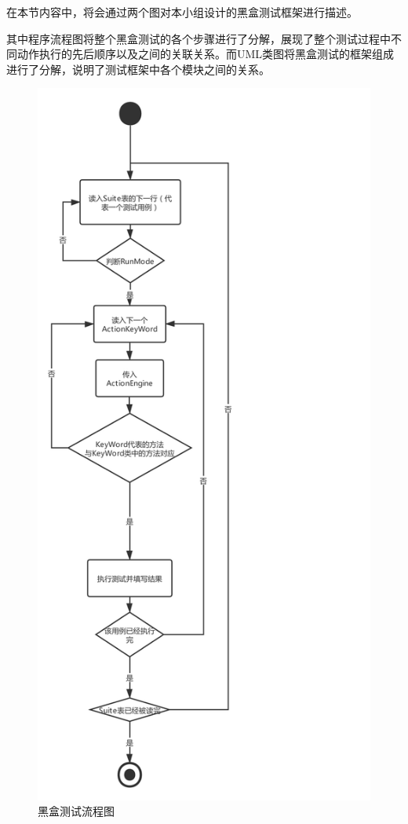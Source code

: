 \documentclass[hyperref, a4paper]{ctexart}
\begin{document}
在本节内容中，将会通过两个图对本小组设计的黑盒测试框架进行描述。

其中程序流程图将整个黑盒测试的各个步骤进行了分解，展现了整个测试过程中不同动作执行的先后顺序以及之间的关联关系。而UML类图将黑盒测试的框架组成进行了分解，说明了测试框架中各个模块之间的关系。

\begin{figure}
  \centering
  \includegraphics[scale=0.5]{./FlowChart.pdf}
  \caption{黑盒测试流程图}\label{1}
\end{figure}
\end{document}
